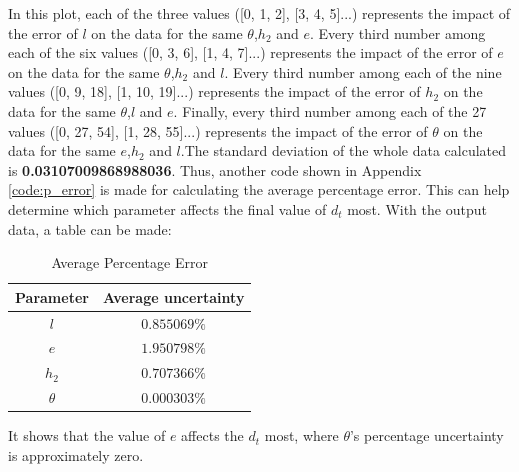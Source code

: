 \documentclass[conference]{IEEEtran}
\begin{document}
    In this plot, each of the three values ([0, 1, 2], [3, 4, 5]...) represents the impact of the error of $l$ on the data for the same $\theta$,$h_2$ and $e$. Every third number among each of the six values ([0, 3, 6], [1, 4, 7]...) represents the impact of the error of $e$ on the data for the same $\theta$,$h_2$ and $l$. Every third number among each of the nine values ([0, 9, 18], [1, 10, 19]...) represents the impact of the error of $h_2$ on the data for the same $\theta$,$l$ and $e$. Finally, every third number among each of the 27 values ([0, 27, 54], [1, 28, 55]...) represents the impact of the error of $\theta$ on the data for the same $e$,$h_2$ and $l$.The standard deviation of the whole data calculated is \textbf{0.03107009868988036}.\newline
    Thus, another code shown in Appendix \ref{code:p_error} is made for calculating the average percentage error. This can help determine which parameter affects the final value of $d_t$ most. With the output data, a table can be made:
    
    \begin{table}[H]
        \caption {Average Percentage Error} \label{tb:a_p_e} 
        \begin{center}
            \begin{tabular}{cc}
                \hline
                Parameter & Average uncertainty \\
                \hline
                $l$         & $0.855069\%$     \\
                $e$         & $1.950798\%$     \\
                $h_2$       & $0.707366\%$     \\
                $\theta$    & $0.000303\%$     \\
                \hline
            \end{tabular}
        \end{center}
    \end{table}
    It shows that the value of $e$ affects the $d_t$ most, where $\theta$'s percentage uncertainty is approximately zero. 
\end{document}
